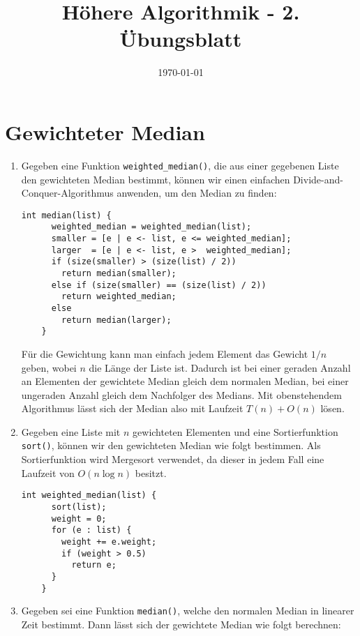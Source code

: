 \documentclass[a4paper,10pt]{scrartcl}
\title{H\"ohere Algorithmik - 2. \"Ubungsblatt}
\author{\Authors}
\date{\today}
\begin{document}
\maketitle

\section{Gewichteter Median}
\begin{enumerate}
\item	Gegeben eine Funktion \texttt{weighted\_median()}, die
	aus einer gegebenen Liste den gewichteten Median bestimmt,
	können wir einen einfachen Divide-and-Conquer-Algorithmus
	anwenden, um den Median zu finden:

	\begin{lstlisting}[numbers=none]
	int median(list) {
	  weighted_median = weighted_median(list);
	  smaller = [e | e <- list, e <= weighted_median];
	  larger  = [e | e <- list, e >  weighted_median];
	  if (size(smaller) > (size(list) / 2))
	    return median(smaller);
	  else if (size(smaller) == (size(list) / 2))
	    return weighted_median;
	  else
	    return median(larger);
	}
	\end{lstlisting}

	Für die Gewichtung kann man einfach jedem Element das Gewicht
	$1/n$ geben, wobei $n$ die Länge der Liste ist. Dadurch ist bei
	einer geraden Anzahl an Elementen der gewichtete Median gleich
	dem normalen Median, bei einer ungeraden Anzahl gleich dem
	Nachfolger des Medians. Mit obenstehendem Algorithmus lässt sich
	der Median also mit Laufzeit $T(n) + O(n)$ lösen.

\item	Gegeben eine Liste mit $n$ gewichteten Elementen und eine
	Sortierfunktion \texttt{sort()}, können wir den gewichteten
	Median wie folgt bestimmen. Als Sortierfunktion wird Mergesort
	verwendet, da dieser in jedem Fall eine Laufzeit von $O(n \log n)$ besitzt.

	\begin{lstlisting}[numbers=none]
	int weighted_median(list) {
	  sort(list);
	  weight = 0;
	  for (e : list) {
	    weight += e.weight;
	    if (weight > 0.5)
	      return e;
	  }
	}
	\end{lstlisting}

\item	Gegeben sei eine Funktion \texttt{median()}, welche den normalen
	Median in linearer Zeit bestimmt. Dann lässt sich der gewichtete
	Median wie folgt berechnen:


\end{enumerate}
\end{document}
